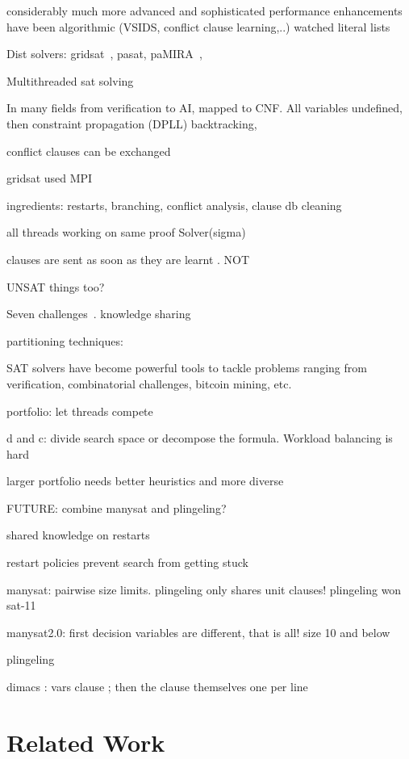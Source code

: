 \documentclass{article}
\begin{document}
considerably much more advanced and sophisticated
performance enhancements have been algorithmic (VSIDS, conflict clause learning,..) 
watched literal lists 

Dist solvers: gridsat~\cite{chrabakh2003gridsat}, pasat, paMIRA~\cite{schubert2005pamira}, 

Multithreaded sat solving~\cite{lewis2007multithreaded}

In many fields from verification to AI, mapped to CNF. All variables
undefined, then constraint propagation (DPLL) backtracking,

conflict clauses can be exchanged

gridsat used MPI 

ingredients: restarts, branching, conflict analysis, clause db cleaning

all threads working on same proof Solver(sigma) 

clauses are sent as soon as they are learnt . NOT 

UNSAT things too? 

Seven challenges~\cite{hamadi2013seven}. knowledge sharing

partitioning techniques: ~\cite{hyvarinen2010partitioning}

SAT solvers have become powerful tools to tackle problems ranging from
verification, combinatorial challenges, bitcoin mining, etc.

portfolio: let threads compete 

d and c: divide search space or decompose the formula. Workload balancing is hard 

larger portfolio needs better heuristics and more diverse 

FUTURE: combine manysat and plingeling?

shared knowledge on restarts 

restart policies prevent search from getting stuck 

manysat: pairwise size limits. plingeling only shares unit clauses! plingeling won sat-11

manysat2.0: first decision variables are different, that is all! size 10 and below 

plingeling ~\cite{biere2010lingeling}

dimacs : vars clause ; then the clause themselves one per line 




\section{Related Work}
\end{document}
